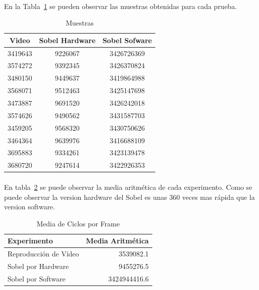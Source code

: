 \documentclass[a4paper,12pt,titlepage,final]{book}
\begin{document}
\paragraph{}
En la Tabla~\ref{tab:Muestras} se pueden observar las muestras obtenidas para cada prueba.

\begin{table}[hd]
\centering
\begin{tabular}{*{3}{c}}
Video   & Sobel Hardware & Sobel Sofware \\
\hline
3419643 &    9226067     &  3426726369   \\
3574272 &    9392345     &  3426370824   \\
3480150 &    9449637     &  3419864988   \\
3568071 &    9512463     &  3425147698   \\
3473887 &    9691520     &  3426242018   \\
3574626 &    9490562     &  3431587703   \\
3459205 &    9568320     &  3430750626   \\
3464364 &    9639976     &  3416688109   \\
3695883 &    9334261     &  3423139478   \\
3680720 &    9247614     &  3422926353   \\
\end{tabular}
\caption{Muestras}
\label{tab:Muestras}
\end{table}

\paragraph{}
En tabla~\ref{tab:resutadosc} se puede observar la media aritmética de cada experimento. Como se puede observar la version hardware del Sobel es unas 360 veces mas rápida que la version software.

\begin{table}[hd]
\centering
\begin{tabular}{l r}
Experimento            & Media Aritmética \\
\hline
Reproducción de Vídeo  &    3539082.1     \\
Sobel por Hardware     &    9455276.5     \\
Sobel por Software     &   3424944416.6   \\
\end{tabular}
\caption{Media de Ciclos por Frame}
\label{tab:resutadosc}
\end{table}
\end{document}
